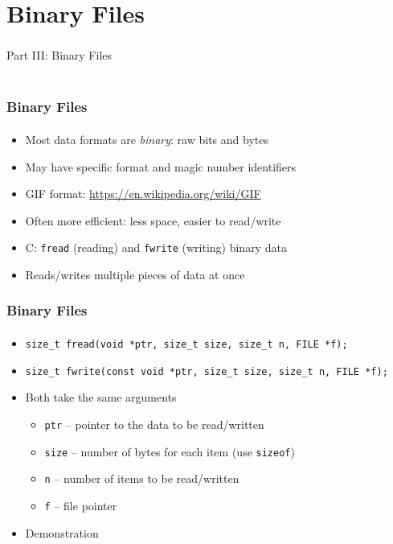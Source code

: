 \documentclass[]{beamer}
\begin{document}
\section{Binary Files}

\begin{frame}
  \frametitle{}
  \framesubtitle{}
    
    \begin{center}
    {\Huge Part III: Binary Files}\\
    {\Large ~}
    \end{center}

\end{frame}

\begin{frame}[fragile]
  \frametitle{Binary Files}
  \framesubtitle{}

\begin{itemize}[<+->]
  \item Most data formats are \emph{binary}: raw bits and bytes
  \item May have specific format and magic number identifiers
  \item GIF format: \url{https://en.wikipedia.org/wiki/GIF}
  \item Often more efficient: less space, easier to read/write
  \item C: \texttt{fread} (reading) and \texttt{fwrite} (writing) binary data
  \item Reads/writes multiple pieces of data at once
\end{itemize}
  
\end{frame}

\begin{frame}[fragile]
  \frametitle{Binary Files}
  \framesubtitle{}
  
\begin{itemize}[<+->]
    \item \texttt{size_t fread(void *ptr, size_t size, size_t n, FILE *f);}
    \item \texttt{size_t fwrite(const void *ptr, size_t size, size_t n, FILE *f);}
    \item Both take the same arguments
    \begin{itemize}
      \item \texttt{ptr} -- pointer to the data to be read/written
      \item \texttt{size} -- number of bytes for each item (use \texttt{sizeof})
      \item \texttt{n} -- number of items to be read/written
      \item \texttt{f} -- file pointer
    \end{itemize}
    \item Demonstration
\end{itemize}

\end{frame}
\end{document}
